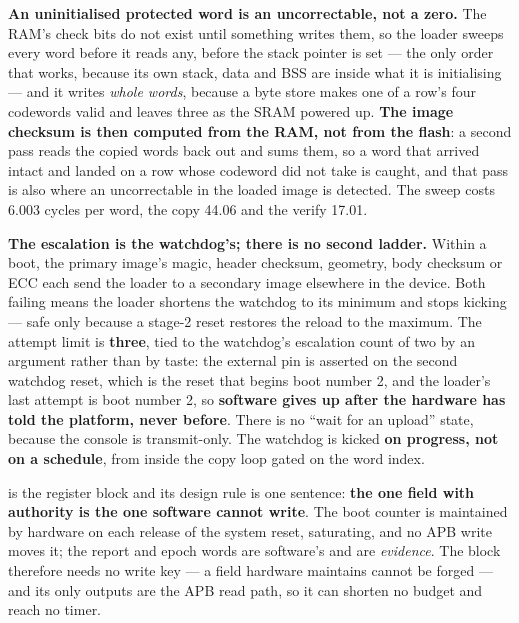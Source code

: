\textbf{An uninitialised protected word is an uncorrectable, not a
zero.} The RAM's check bits do not exist until something writes them, so
the loader sweeps every word before it reads any, before the stack
pointer is set --- the only order that works, because its own stack, data
and BSS are inside what it is initialising --- and it writes \emph{whole
words}, because a byte store makes one of a row's four codewords valid
and leaves three as the SRAM powered up. \textbf{The image checksum is then computed from the RAM, not from the
flash}: a second pass reads the copied words back out and sums them, so a
word that arrived intact and landed on a row whose codeword did not take
is caught, and that pass is also where an uncorrectable in the loaded
image is detected. The sweep costs 6.003 cycles per word, the copy 44.06
and the verify 17.01.

\textbf{The escalation is the watchdog's; there is no second ladder.}
Within a boot, the primary image's magic, header checksum, geometry, body
checksum or ECC each send the loader to a secondary image elsewhere in the device. Both
failing means the loader shortens the watchdog to its minimum and stops
kicking --- safe only because a stage-2 reset restores the reload to the
maximum. The attempt limit is \textbf{three}, tied
to the watchdog's escalation count of two by an argument rather than by
taste: the external pin is asserted on the second watchdog reset, which
is the reset that begins boot number 2, and the loader's last attempt is
boot number 2, so \textbf{software gives up after the hardware has told
the platform, never before}. There is no ``wait for an upload'' state, because the console is
transmit-only. The watchdog is kicked \textbf{on progress, not on
a schedule}, from inside the copy loop gated on the word index.

 is the register block and its design rule is one
sentence: \textbf{the one field with authority is the one software cannot
write}. The boot counter is maintained by hardware on each release of the
system reset, saturating, and no APB write moves it; the report and epoch
words are software's and are \emph{evidence}. The block therefore needs
no write key --- a field hardware maintains cannot be forged --- and its
only outputs are the APB read path, so it can shorten no budget and reach
no timer.

